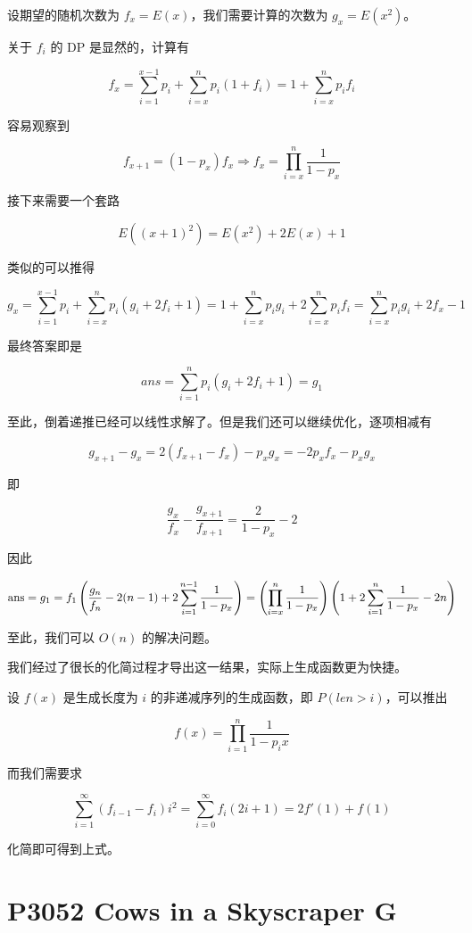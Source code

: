 设期望的随机次数为 $f_x = E(x)$，我们需要计算的次数为
$g_x = E(x^2)$。

关于 $f_i$ 的 DP 是显然的，计算有

\[ f_x = \sum_{i = 1}^{x - 1} p_i + \sum_{i = x}^n p_i(1 + f_i)
= 1 + \sum_{i = x}^n p_i f_i \]

容易观察到

\[ f_{x + 1} =(1 - p_x) f_x \Rightarrow f_x = \prod_{i = x}^n \frac{1}{1 - p_x} \]

接下来需要一个套路

\[ E((x + 1)^2) = E(x^2) + 2 E(x) + 1 \]

类似的可以推得

\[ g_x = \sum_{i = 1}^{x - 1} p_i + \sum_{i = x}^n p_i(g_i + 2 f_i + 1)  = 1
   + \sum_{i = x}^n p_i g_i + 2 \sum_{i = x}^n p_i f_i = \sum_{i = x}^n p_i
   g_i + 2 f_x - 1 \]

最终答案即是

\[ ans = \sum_{i = 1}^n p_i(g_i + 2 f_i + 1)  = g_1 \]

至此，倒着递推已经可以线性求解了。但是我们还可以继续优化，逐项相减有

\[ g_{x + 1} - g_x = 2(f_{x + 1} - f_x) - p_x g_x = - 2 p_x f_x - p_x g_x \]

即

\[ \frac{g_x}{f_x} - \frac{g_{x + 1}}{f_{x + 1}} = \frac{2}{1 - p_x} - 2 \]

因此

\[ {\rm ans} = g_1 = f_1 \left( \frac{g_n}{f_n} - 2(n - 1) + 2 \sum_{i =
   1}^{n - 1} \frac{1}{1 - p_x} \right) = \left( \prod_{i = x}^n \frac{1}{1 -
   p_x} \right) \left( 1 + 2 \sum_{i = 1}^n \frac{1}{1 - p_x} - 2 n \right) \]

至此，我们可以 $O(n)$ 的解决问题。

我们经过了很长的化简过程才导出这一结果，实际上生成函数更为快捷。

设 $f(x)$ 是生成长度为 $i$ 的非递减序列的生成函数，即 $P(len > i)$，可以推出

\[ f(x) = \prod_{i = 1}^n \frac{1}{1 - p_i x} \]

而我们需要求

\[ \sum_{i = 1}^{\infty} (f_{i - 1} - f_i) i^2 = \sum_{i = 0}^{\infty} f_i (2 i + 1) = 2 f'(1) + f(1) \]

化简即可得到上式。


\section{P3052 Cows in a Skyscraper G}

